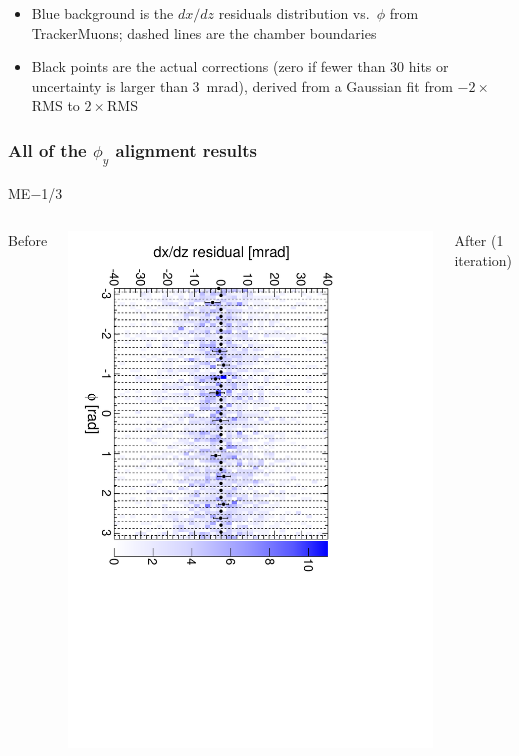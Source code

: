 \documentclass[compress]{beamer}
\begin{document}
\begin{frame}
\begin{itemize}
\item Blue background is the $dx/dz$ residuals distribution
  vs.\ $\phi$ from TrackerMuons; dashed lines are the chamber boundaries
\item Black points are the actual corrections (zero if fewer than 30
  hits or uncertainty is larger than 3~mrad), derived from a Gaussian
  fit from $-2\times$RMS to $2\times$RMS
\end{itemize}
\end{frame}
\begin{frame}
\frametitle{All of the $\phi_y$ alignment results}
\begin{center}
ME$-$1/3
\end{center}

\begin{columns}
\centering Before

\includegraphics[height=\linewidth, angle=90]{iter01_mem13.pdf}

\centering After (1 iteration)


\end{columns}
\end{frame}
\end{document}

